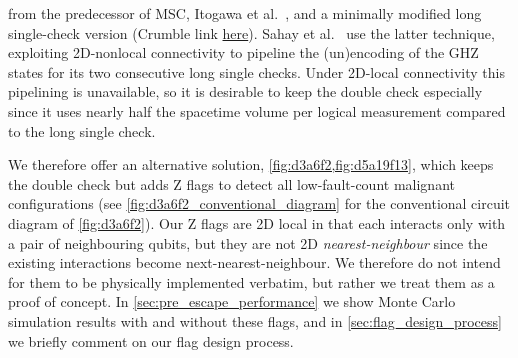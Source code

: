 from the predecessor of MSC, Itogawa et al.~\cite{Itogawa2025},
and a minimally modified long single-check version
(Crumble link \href{https://algassert.com/crumble\#circuit=Q(0,0)0;Q(0,1)1;Q(0,3)2;Q(0,4)3;Q(1,0)4;Q(1,1)5;Q(1,2)6;Q(1,3)7;Q(1,4)8;Q(2,0)9;Q(2,1)10;Q(2,2)11;Q(2,3)12;Q(2,4)13;Q(3,0)14;Q(3,1)15;Q(3,2)16;Q(3,3)17;Q(3,4)18;MPP_Y1*Y5*Y10*Y6*Y12*Y7*Y2;POLYGON(0,0,1,0.25)2_1_6_7;POLYGON(0,1,0,0.25)5_7_12;POLYGON(1,0,0,0.25)1_6_10;DT(0,1,0)rec[-1];TICK;MPP_X1*X6*X7*X2;TICK;MPP_X1*X5*X10*X6;TICK;MPP_X6*X5*X12*X7;TICK;MPP_Z1*Z6*Z7*Z2;TICK;MPP_Z1*Z5*Z10*Z6;TICK;MPP_Z6*Z5*Z12*Z7;TICK;R_17;RX_16;TICK;CX_16_17;R_18_15;TICK;CX_17_18_16_15;R_14_13_11;TICK;CX_15_14_18_13_16_11;R_8_9;TICK;CX_14_9_13_8;R_4_3;TICK;CX_8_3_9_4;R_0;TICK;CX_4_0;S_1_5_7;S_DAG_2_6_12_10;TICK;CX_8_7_13_12_4_5_9_10_11_6_0_1_3_2;TICK;CX_4_0;S_6_2_12_10;S_DAG_5_1_7;TICK;CX_8_3_9_4;M_0;DT(0,0,1)rec[-1];TICK;CX_14_9_13_8;M_4_3;DT(1,0,2)rec[-2];DT(0,4,2)rec[-1];TICK;CX_15_14_18_13_16_11;M_9_8;DT(2,0,3)rec[-2];DT(1,4,3)rec[-1];TICK;CX_17_18_16_15;M_14_11_13;DT(3,0,4)rec[-3];DT(2,2,4)rec[-2];DT(2,4,4)rec[-1];TICK;CX_16_17;M_15_18;DT(3,1,5)rec[-2];DT(3,4,5)rec[-1];TICK;M_17;MX_16;DT(3,3,6)rec[-2];DT(0,1,6)rec[-1]_rec[-19];TICK;MPP_X1*X6*X7*X2;DT(0,1,7)rec[-1]_rec[-19];TICK;MPP_X1*X5*X10*X6;DT(0,1,8)rec[-1]_rec[-19];TICK;MPP_X6*X5*X12*X7;DT(1,2,9)rec[-1]_rec[-19];TICK;MPP_Z1*Z6*Z7*Z2;DT(0,1,10)rec[-1]_rec[-19];TICK;MPP_Z1*Z5*Z10*Z6;DT(0,1,11)rec[-1]_rec[-19];TICK;MPP_Z6*Z5*Z12*Z7;DT(1,2,12)rec[-1]_rec[-19];TICK;MPP_Y1*Y5*Y10*Y6*Y12*Y7*Y2;OI(0)rec[-1]_rec[-8]}{here}).
Sahay et al.~\cite[\S B.3.c]{Sahay2026} use the latter technique,
exploiting 2D-nonlocal connectivity
to pipeline the (un)encoding of the GHZ states
for its two consecutive long single checks.
Under 2D-local connectivity this pipelining is unavailable,
so it is desirable to keep the double check
especially since it uses nearly half the spacetime volume
per logical measurement compared to the long single check.

We therefore offer an alternative solution,
\cref{fig:d3a6f2,fig:d5a19f13},
which keeps the double check but adds Z flags
to detect all low-fault-count malignant configurations
(see \cref{fig:d3a6f2_conventional_diagram} for
the conventional circuit diagram of \cref{fig:d3a6f2}).
Our Z flags are 2D local in that
	each interacts only with a pair of neighbouring qubits,
but they are not 2D \emph{nearest-neighbour} since
	the existing interactions become next-nearest-neighbour.
We therefore do not intend for them to be physically implemented verbatim,
but rather we treat them as a proof of concept.
In \cref{sec:pre_escape_performance} we show
Monte Carlo simulation results with and without these flags,
and in \cref{sec:flag_design_process}
we briefly comment on our flag design process.

